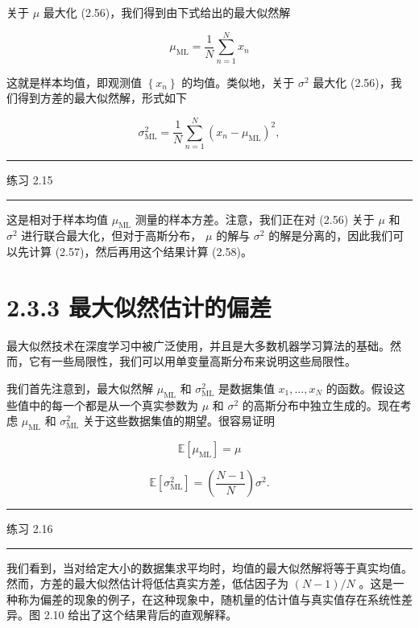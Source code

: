 \documentclass[10pt]{report}
\newcommand{\HRule}{\begin{center}\rule{0.9\linewidth}{0.2mm}\end{center}}
\begin{document}
关于 \(\mu\) 最大化 (2.56)，我们得到由下式给出的最大似然解

\[
{\mu }_{\mathrm{{ML}}} = \frac{1}{N}\mathop{\sum }\limits_{{n = 1}}^{N}{x}_{n} \tag{2.57}
\]

这就是样本均值，即观测值 \(\left\{  {x}_{n}\right\}\) 的均值。类似地，关于 \({\sigma }^{2}\) 最大化 (2.56)，我们得到方差的最大似然解，形式如下

\[
{\sigma }_{\mathrm{{ML}}}^{2} = \frac{1}{N}\mathop{\sum }\limits_{{n = 1}}^{N}{\left( {x}_{n} - {\mu }_{\mathrm{{ML}}}\right) }^{2}, \tag{2.58}
\]

\HRule

练习 2.15

\HRule

这是相对于样本均值 \({\mu }_{\mathrm{{ML}}}\) 测量的样本方差。注意，我们正在对 (2.56) 关于 \(\mu\) 和 \({\sigma }^{2}\) 进行联合最大化，但对于高斯分布， \(\mu\) 的解与 \({\sigma }^{2}\) 的解是分离的，因此我们可以先计算 (2.57)，然后再用这个结果计算 (2.58)。

\section*{2.3.3 最大似然估计的偏差}

最大似然技术在深度学习中被广泛使用，并且是大多数机器学习算法的基础。然而，它有一些局限性，我们可以用单变量高斯分布来说明这些局限性。

我们首先注意到，最大似然解 \({\mu }_{\mathrm{{ML}}}\) 和 \({\sigma }_{\mathrm{{ML}}}^{2}\) 是数据集值 \({x}_{1},\ldots ,{x}_{N}\) 的函数。假设这些值中的每一个都是从一个真实参数为 \(\mu\) 和 \({\sigma }^{2}\) 的高斯分布中独立生成的。现在考虑 \({\mu }_{\mathrm{{ML}}}\) 和 \({\sigma }_{\mathrm{{ML}}}^{2}\) 关于这些数据集值的期望。很容易证明

\[
\mathbb{E}\left\lbrack  {\mu }_{\mathrm{{ML}}}\right\rbrack   = \mu  \tag{2.59}
\]

\[
\mathbb{E}\left\lbrack  {\sigma }_{\mathrm{{ML}}}^{2}\right\rbrack   = \left( \frac{N - 1}{N}\right) {\sigma }^{2}. \tag{2.60}
\]

\HRule

练习 2.16

\HRule

我们看到，当对给定大小的数据集求平均时，均值的最大似然解将等于真实均值。然而，方差的最大似然估计将低估真实方差，低估因子为 \(\left( {N - 1}\right) /N\) 。这是一种称为偏差的现象的例子，在这种现象中，随机量的估计值与真实值存在系统性差异。图 2.10 给出了这个结果背后的直观解释。
\end{document}
